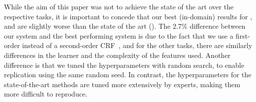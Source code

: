 While the aim of this paper was not to achieve the state of the art over
the respective tasks, it is important to concede that our best
(in-domain) results for \ner, \pos and \chunking are
slightly worse than the state of the art
(). The 2.7\% difference between our \ner system and
the best performing system is due to the fact that we use a first-order
instead of a second-order CRF~\cite{Ando:2005}, and for the other tasks,
there are similarly differences in the learner and the complexity of the
features used.
Another difference is that we tuned the hyperparameters with random
search, to enable replication using the same random seed.
In contrast, the hyperparameters for the state-of-the-art methods are
tuned more extensively by experts, making them more difficult to reproduce.









